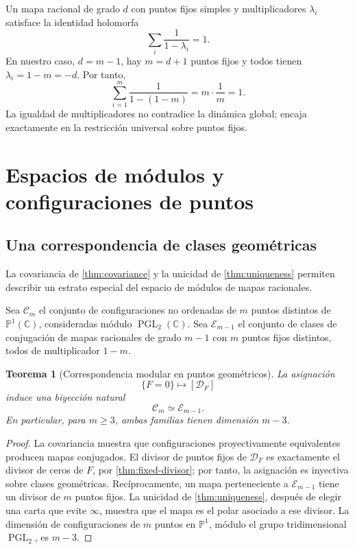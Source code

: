 \documentclass[11pt,oneside]{scrartcl}
\theoremstyle{plainblue}
\newtheorem{theorem}{Teorema}[section]
\theoremstyle{definitionblue}
\theoremstyle{remarkgray}
\newcommand{\CC}{\mathbb{C}}
\newcommand{\PP}{\mathbb{P}}
\newcommand{\PGL}{\operatorname{PGL}}
\newcommand{\cD}{\mathcal{D}}
\newcommand{\cE}{\mathcal{E}}
\newcommand{\cC}{\mathcal{C}}
\begin{document}
Un mapa racional de grado \(d\) con puntos fijos simples y multiplicadores
\(\lambda_i\) satisface la identidad holomorfa \cite{Milnor}
\[
\sum_i\frac{1}{1-\lambda_i}=1.
\]
En nuestro caso, \(d=m-1\), hay \(m=d+1\) puntos fijos y todos tienen
\(\lambda_i=1-m=-d\). Por tanto,
\[
\sum_{i=1}^{m}\frac1{1-(1-m)}
=m\cdot\frac1m=1.
\]
La igualdad de multiplicadores no contradice la dinámica global; encaja exactamente
en la restricción universal sobre puntos fijos.

\section{Espacios de módulos y configuraciones de puntos}

\subsection{Una correspondencia de clases geométricas}

La covariancia de \cref{thm:covariance} y la unicidad de \cref{thm:uniqueness}
permiten describir un estrato especial del espacio de módulos de mapas racionales.

Sea \(\cC_m\) el conjunto de configuraciones no ordenadas de \(m\) puntos distintos
de \(\PP^1(\CC)\), consideradas módulo \(\PGL_2(\CC)\). Sea \(\cE_{m-1}\) el
conjunto de clases de conjugación de mapas racionales de grado \(m-1\) con \(m\)
puntos fijos distintos, todos de multiplicador \(1-m\).

\begin{theorem}[Correspondencia modular en puntos geométricos]\label{thm:moduli-bijection}
La asignación
\begin{equation}\label{eq:moduli-map}
\{F=0\}\longmapsto[\cD_F]
\end{equation}
induce una biyección natural
\begin{equation}\label{eq:moduli-bijection}
\boxed{\cC_m\simeq\cE_{m-1}.}
\end{equation}
En particular, para \(m\ge3\), ambas familias tienen dimensión \(m-3\).
\end{theorem}

\begin{proof}
La covariancia muestra que configuraciones proyectivamente equivalentes producen
mapas conjugados. El divisor de puntos fijos de \(\cD_F\) es exactamente el divisor
de ceros de \(F\), por \cref{thm:fixed-divisor}; por tanto, la asignación es
inyectiva sobre clases geométricas. Recíprocamente, un mapa perteneciente a
\(\cE_{m-1}\) tiene un divisor de \(m\) puntos fijos. La unicidad de
\cref{thm:uniqueness}, después de elegir una carta que evite \(\infty\), muestra que
el mapa es el polar asociado a ese divisor. La dimensión de configuraciones de
\(m\) puntos en \(\PP^1\), módulo el grupo tridimensional \(\PGL_2\), es \(m-3\).
\end{proof}
\end{document}
